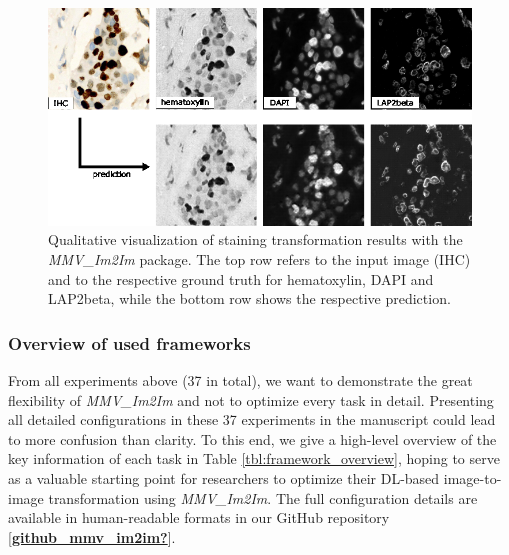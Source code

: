 \begin{figure}
\hypertarget{fig:multiplex}{%
\centering
\includegraphics{images/multiplex_justin.png}
\caption{Qualitative visualization of staining transformation results with the \emph{MMV\_Im2Im} package. The top row refers to the input image (IHC) and to the respective ground truth for hematoxylin, DAPI and LAP2beta, while the bottom row shows the respective prediction.}\label{fig:multiplex}
}
\end{figure}

\hypertarget{overview-of-used-frameworks}{%
\subsubsection{Overview of used frameworks}\label{overview-of-used-frameworks}}

From all experiments above (37 in total), we want to demonstrate the great flexibility of \emph{MMV\_Im2Im} and not to optimize every task in detail. Presenting all detailed configurations in these 37 experiments in the manuscript could lead to more confusion than clarity. To this end, we give a high-level overview of the key information of each task in Table \ref{tbl:framework_overview}, hoping to serve as a valuable starting point for researchers to optimize their DL-based image-to-image transformation using \emph{MMV\_Im2Im}. The full configuration details are available in human-readable formats in our GitHub repository {[}\protect\hyperlink{ref-github_mmv_im2im}{\textbf{github\_mmv\_im2im?}}{]}.

